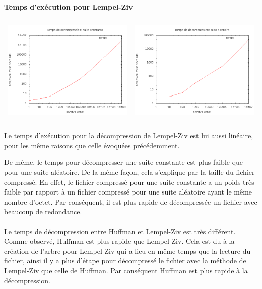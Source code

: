 \documentclass{report}
\begin{document}
\paragraph*{}
\textbf{Temps d’exécution pour Lempel-Ziv}
\subparagraph*{}
\hspace{-2cm}\begin{tabular}{l | l}
\includegraphics[width=7cm]{tempsDlzC.png} & 
\includegraphics[width=7cm]{tempsDlzA.png}
\end{tabular}
\subparagraph*{}

Le temps d'exécution pour la décompression de Lempel-Ziv est lui aussi linéaire, pour les même raisons que celle évoquées précédemment.

De même, le temps pour décompresser une suite constante est plus faible que pour une suite aléatoire. De la même façon, cela s'explique par la taille du fichier compressé. En effet, le fichier compressé pour une suite constante a un poids très faible par rapport à un fichier compressé pour une suite aléatoire ayant le même nombre d'octet. Par conséquent, il est plus rapide de décompressée un fichier avec beaucoup de redondance.

\paragraph*{}
Le temps de décompression entre Huffman et Lempel-Ziv est très différent. Comme observé, Huffman est plus rapide que Lempel-Ziv. Cela est du à la création de l'arbre pour Lempel-Ziv qui a lieu en même temps que la lecture du fichier, ainsi il y a plus d'étape pour décompressé le fichier avec la méthode de Lempel-Ziv que celle de Huffman. Par conséquent Huffman est plus rapide à la décompression.
\end{document}
